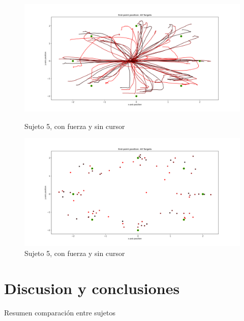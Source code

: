 \documentclass[a4paper,11pt, oneside]{book}
\begin{document}
\begin{figure}[H]
	\begin{minipage}[b]{0.5\linewidth}
		\centering
		\includegraphics[width=\linewidth]{sujeto5/force_no_cursor/trayectorias}
		\caption{Sujeto 5, con fuerza y sin cursor}
		\label{fig:figura1}
	\end{minipage}
	\hspace{0.5cm}
	\begin{minipage}[b]{0.5\linewidth}
		\centering
		\includegraphics[width=\linewidth]{sujeto5/force_no_cursor/trayectorias_puntos}
		\caption{Sujeto 5, con fuerza y sin cursor}
		\label{fig:figura2}
	\end{minipage}
\end{figure}


\chapter{Discusion y conclusiones}
Resumen comparación entre sujetos



\end{document}
